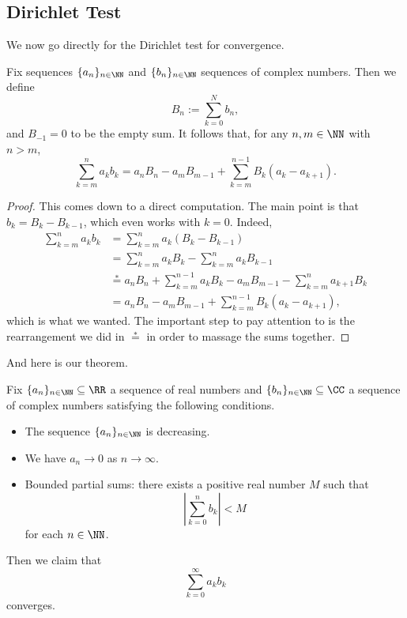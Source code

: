 \subsection{Dirichlet Test}
We now go directly for the Dirichlet test for convergence.
\begin{lemma} \label{lem:sumparts}
	Fix sequences $\{a_n\}_{n\in\NN}$ and $\{b_n\}_{n\in\NN}$ sequences of complex numbers. Then we define
	\[B_n:=\sum_{k=0}^Nb_n,\]
	and $B_{-1}=0$ to be the empty sum. It follows that, for any $n,m\in\NN$ with $n>m$,
	\[\sum_{k=m}^na_kb_k=a_nB_n-a_mB_{m-1}+\sum_{k=m}^{n-1}B_k(a_k-a_{k+1}).\]
\end{lemma}
\begin{proof}
	This comes down to a direct computation. The main point is that $b_k=B_k-B_{k-1}$, which even works with $k=0$. Indeed,
	\begin{align*}
		\sum_{k=m}^na_kb_k &= \sum_{k=m}^na_k(B_k-B_{k-1}) \\
		&= \sum_{k=m}^na_kB_k-\sum_{k=m}^na_kB_{k-1} \\
		&\stackrel*= a_nB_n+\sum_{k=m}^{n-1}a_kB_k-a_mB_{m-1}-\sum_{k=m}^na_{k+1}B_k \\
		&= a_nB_n-a_mB_{m-1}+\sum_{k=m}^{n-1}B_k(a_k-a_{k+1}),
	\end{align*}
	which is what we wanted. The important step to pay attention to is the rearrangement we did in $\stackrel*=$ in order to massage the sums together.
\end{proof}
And here is our theorem.
\begin{theorem}
	Fix $\{a_n\}_{n\in\NN}\subseteq\RR$ a sequence of real numbers and $\{b_n\}_{n\in\NN}\subseteq\CC$ a sequence of complex numbers satisfying the following conditions.
	\begin{itemize}
		\item The sequence $\{a_n\}_{n\in\NN}$ is decreasing.
		\item We have $a_n\to0$ as $n\to\infty$.
		\item Bounded partial sums: there exists a positive real number $M$ such that
		\[\left|\sum_{k=0}^nb_k\right|<M\]
		for each $n\in\NN$.
	\end{itemize}
	Then we claim that
	\[\sum_{k=0}^\infty a_kb_k\]
	converges.
\end{theorem}
